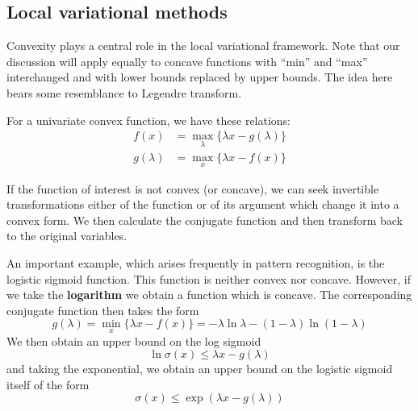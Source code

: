 \documentclass[a4paper]{report}
\begin{document}
\subsection{Local variational methods}\label{localV}
Convexity plays a central role in the local variational framework. Note that our discussion will apply equally to concave functions with ``min'' and ``max'' interchanged and with lower bounds replaced by upper bounds. The idea here bears some resemblance to Legendre transform.

For a univariate convex function, we have these relations:
\begin{align}
	f(x) &= \max_{\lambda} \{ \lambda x - g(\lambda) \} \\	
	g(\lambda) &= \max_{x} \{ \lambda x -f(x)  \}
\end{align}

If the function of interest is not convex (or concave), we can seek invertible transformations either of the function or of its argument which change it into a convex form. We then calculate the conjugate function and then transform back to the original variables.

An important example, which arises frequently in pattern recognition, is the logistic sigmoid function. This function is neither convex nor concave. However, if we take the \textbf{logarithm} we obtain a function which is concave. The corresponding conjugate function then takes the form
\begin{equation}
	g(\lambda) = \min_x \{ \lambda x-f(x) \} = -\lambda \ln \lambda - (1-\lambda) \ln (1- \lambda )
\end{equation}
We then obtain an upper bound on the log sigmoid
\begin{equation}
	\ln \sigma(x) \leq \lambda x - g(\lambda)
\end{equation}
and taking the exponential, we obtain an upper bound on the logistic sigmoid itself of the form
\begin{equation}
	\sigma(x) \leq \exp(\lambda x - g(\lambda))
\end{equation}
\end{document}

